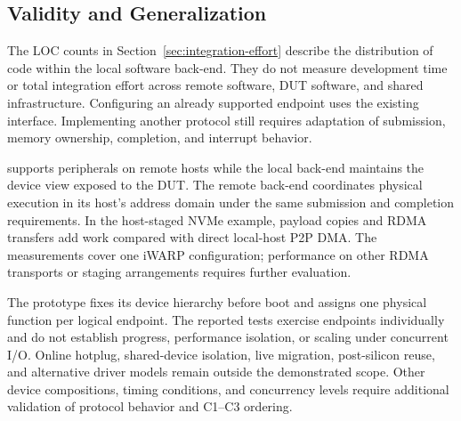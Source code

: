 \subsection{Validity and Generalization}

The LOC counts in Section~\ref{sec:integration-effort} describe the
distribution of code within the local software back-end. They do not
measure development time or total integration effort across remote software,
DUT software, and shared infrastructure. Configuring an already supported endpoint uses
the existing interface. Implementing another protocol still requires
adaptation of submission, memory ownership, completion, and interrupt
behavior.

\sys supports peripherals on remote hosts while the local back-end
maintains the device view exposed to the DUT. The remote back-end
coordinates physical execution in its host's address domain under the
same submission and completion requirements. In the host-staged NVMe
example, payload copies and RDMA transfers add work compared with direct
local-host P2P DMA. The measurements cover one iWARP configuration;
performance on other RDMA transports or staging arrangements requires
further evaluation.

The prototype fixes its device hierarchy before boot and assigns one physical
function per logical endpoint. The reported tests exercise endpoints
individually and do not establish progress, performance isolation, or scaling
under concurrent I/O. Online hotplug, shared-device isolation, live
migration, post-silicon reuse, and alternative driver models remain outside
the demonstrated scope. Other device compositions, timing conditions, and
concurrency levels require additional validation of protocol behavior and
C1--C3 ordering.
